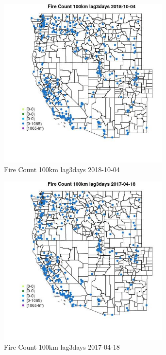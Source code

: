 \begin{figure} 
\centering  
\includegraphics[width=0.77\textwidth]{Code_Outputs/Report_ML_input_PM25_Step4_part_f_de_duplicated_aveswNAs_MapObsFire_Count_100km_lag3days2018-10-04.jpg} 
\caption{\label{fig:Report_ML_input_PM25_Step4_part_f_de_duplicated_aveswNAsMapObsFire_Count_100km_lag3days2018-10-04}Fire Count 100km lag3days 2018-10-04} 
\end{figure} 
 

\begin{figure} 
\centering  
\includegraphics[width=0.77\textwidth]{Code_Outputs/Report_ML_input_PM25_Step4_part_f_de_duplicated_aveswNAs_MapObsFire_Count_100km_lag3days2017-04-18.jpg} 
\caption{\label{fig:Report_ML_input_PM25_Step4_part_f_de_duplicated_aveswNAsMapObsFire_Count_100km_lag3days2017-04-18}Fire Count 100km lag3days 2017-04-18} 
\end{figure} 
 

